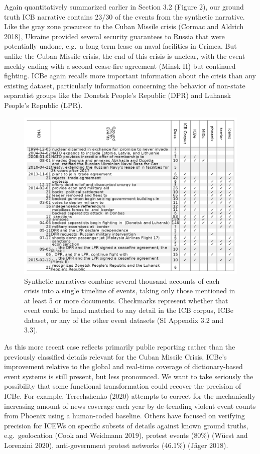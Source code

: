 \documentclass{article}
\begin{document}
Again quantitatively summarized earlier in Section 3.2 (Figure 2), our
ground truth ICB narrative contains 23/30 of the events from the
synthetic narrative. Like the gray zone precursor to the Cuban Missile
crisis (Cormac and Aldrich 2018), Ukraine provided several security
guarantees to Russia that were potentially undone, e.g.~a long term
lease on naval facilities in Crimea. But unlike the Cuban Missile
crisis, the end of this crisis is unclear, with the event meekly ending
with a second cease-fire agreement (Minsk II) but continued fighting.
ICBe again recalls more important information about the crisis than any
existing dataset, particularly information concerning the behavior of
non-state separatist groups like the Donetsk People's Republic (DPR) and
Luhansk People's Republic (LPR).

\begin{figure}
\hypertarget{fig-recall-crimea}{%
\centering
\includegraphics{case_study_crimea_recall.png}
\caption{Synthetic narratives combine several thousand accounts of each
crisis into a single timeline of events, taking only those mentioned in
at least 5 or more documents. Checkmarks represent whether that event
could be hand matched to any detail in the ICB corpus, ICBe dataset, or
any of the other event datasets (SI Appendix 3.2 and
3.3).}\label{fig-recall-crimea}
}
\end{figure}

As this more recent case reflects primarily public reporting rather than
the previously classified details relevant for the Cuban Missile Crisis,
ICBe's improvement relative to the global and real-time coverage of
dictionary-based event systems is still present, but less pronounced. We
want to take seriously the possibility that some functional
transformation could recover the precision of ICBe. For example,
Terechshenko (2020) attempts to correct for the mechanically increasing
amount of news coverage each year by de-trending violent event counts
from Phoenix using a human-coded baseline. Others have focused on
verifying precision for ICEWs on specific subsets of details against
known ground truths, e.g.~geolocation (Cook and Weidmann 2019), protest
events (80\%) (Wüest and Lorenzini 2020), anti-government protest
networks (46.1\%) (Jäger 2018).
\end{document}
